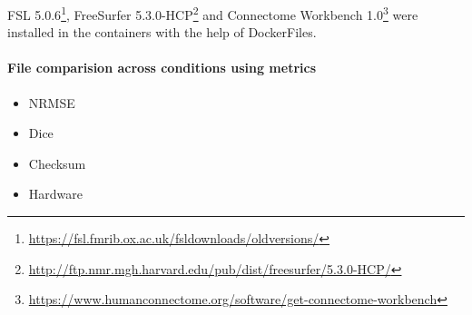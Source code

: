 FSL 5.0.6\footnote{\url{https://fsl.fmrib.ox.ac.uk/fsldownloads/oldversions/}}, FreeSurfer 5.3.0-HCP\footnote{\url{http://ftp.nmr.mgh.harvard.edu/pub/dist/freesurfer/5.3.0-HCP/}} and Connectome Workbench 1.0\footnote{\url{https://www.humanconnectome.org/software/get-connectome-workbench}} were installed in the containers with the help of DockerFiles.

\paragraph{File comparision across conditions using metrics}
\begin{itemize}
  \item NRMSE
  \item Dice
  \item Checksum
  \item Hardware
\end{itemize}

